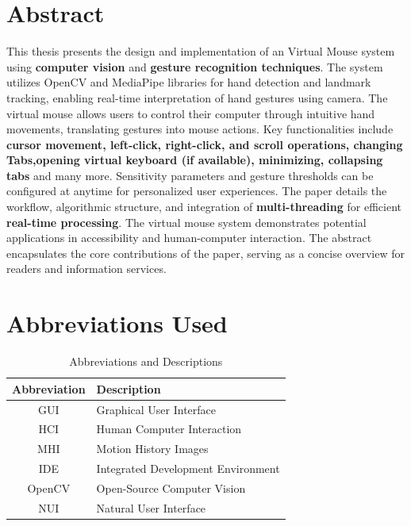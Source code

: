 \documentclass[12pt,a4paper]{report}
\begin{document}
	\chapter*{\centering Abstract }
\label{Abstract}
This thesis presents the design and implementation of an Virtual Mouse system using \textbf{computer vision} and \textbf{gesture recognition techniques}. The system utilizes OpenCV and MediaPipe libraries for hand detection and landmark tracking, enabling real-time interpretation of hand gestures using camera. The virtual mouse allows users to control their computer through intuitive hand movements, translating gestures into mouse actions. Key functionalities include \textbf{cursor movement, left-click, right-click, and scroll operations, changing Tabs,opening virtual keyboard (if available), minimizing, collapsing tabs} and many more. Sensitivity parameters and gesture thresholds can be configured at anytime for personalized user experiences. The paper details the workflow, algorithmic structure, and integration of\textbf{ multi-threading} for efficient \textbf{real-time processing}. The virtual mouse system demonstrates potential applications in accessibility and human-computer interaction. The abstract encapsulates the core contributions of the paper, serving as a concise overview for readers and information services. 

\cleardoublepage

		\chapter*{\centering Abbreviations Used }
		\label{Abbreviations Used}
\begin{table}[h]
    \centering
    \begin{tabular}{|c|p{5cm}|}
        \hline
        \textbf{Abbreviation} & \textbf{Description} \\
        \hline
        GUI & Graphical User Interface \\
        \hline
        HCI & Human Computer Interaction \\
        \hline
        MHI & Motion History Images \\
        \hline
        IDE & Integrated Development Environment \\
        \hline
        OpenCV & Open-Source Computer Vision \\
        NUI & Natural User Interface \\
        \hline
    \end{tabular}
    \caption{Abbreviations and Descriptions}
    \label{tab:abbreviations}
\end{table}
\end{document}
